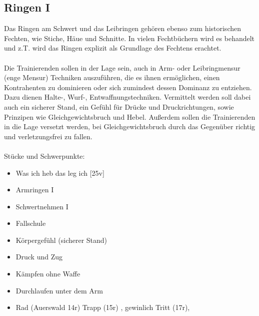 \newpage

\begin{center}
\end{center}

\newpage

\subsection{Ringen I}

Das Ringen am Schwert und das Leibringen gehören ebenso zum historischen Fechten, wie Stiche, Häue und Schnitte. In vielen Fechtbüchern wird es behandelt und z.T. wird das Ringen explizit als Grundlage des Fechtens erachtet.
\\
\\
Die Trainierenden sollen in der Lage sein, auch in Arm- oder Leibringmensur (enge Mensur) Techniken auszuführen, die es ihnen ermöglichen, einen Kontrahenten zu dominieren oder sich zumindest dessen Dominanz zu entziehen. Dazu dienen Halte-, Wurf-, Entwaffnungstechniken. Vermittelt werden soll dabei auch ein sicherer Stand, ein Gefühl für Drücke und Druckrichtungen, sowie Prinzipen wie Gleichgewichtsbruch und Hebel. Außerdem sollen die Trainierenden in die Lage versetzt werden, bei Gleichgewichtsbruch durch das Gegenüber richtig und verletzungsfrei zu fallen.
\\
\\
Stücke und Schwerpunkte:

\begin{itemize}
    \item Was ich heb das leg ich [25v]
    \item Armringen I
    \item Schwertnehmen I
\end{itemize}

\hspace{0.5cm}

\begin{itemize}
    \item Fallschule
    \item Körpergefühl (sicherer Stand)
    \item Druck und Zug
    \item Kämpfen ohne Waffe
    \item Durchlaufen unter dem Arm
    \item Rad (Auerswald 14r) Trapp (15r) , gewinlich Tritt (17r),
\end{itemize}
    
